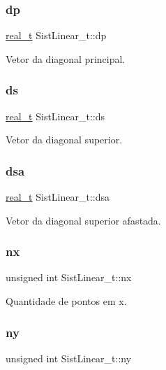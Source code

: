 \subsubsection{\texorpdfstring{dp}{dp}}
{\footnotesize\ttfamily \hyperlink{SistemasLineares_8h_a0d00e2b3dfadee81331bbb39068570c4}{real\+\_\+t} Sist\+Linear\+\_\+t\+::dp}

Vetor da diagonal principal. \mbox{\label{structSistLinear__t_a2ecc07569471ddd006631f7514960bbb}} 
\subsubsection{\texorpdfstring{ds}{ds}}
{\footnotesize\ttfamily \hyperlink{SistemasLineares_8h_a0d00e2b3dfadee81331bbb39068570c4}{real\+\_\+t} Sist\+Linear\+\_\+t\+::ds}

Vetor da diagonal superior. \mbox{\label{structSistLinear__t_aefdf2d67bee5c6471bae21bb7ced88a6}} 
\subsubsection{\texorpdfstring{dsa}{dsa}}
{\footnotesize\ttfamily \hyperlink{SistemasLineares_8h_a0d00e2b3dfadee81331bbb39068570c4}{real\+\_\+t} Sist\+Linear\+\_\+t\+::dsa}

Vetor da diagonal superior afastada. \mbox{\label{structSistLinear__t_a0f02ce66276316fd835180cf6a033001}} 
\subsubsection{\texorpdfstring{nx}{nx}}
{\footnotesize\ttfamily unsigned int Sist\+Linear\+\_\+t\+::nx}

Quantidade de pontos em x. \mbox{\label{structSistLinear__t_a84d8f1f84f050ca4dfc93a4ceaef2b9a}} 
\subsubsection{\texorpdfstring{ny}{ny}}
{\footnotesize\ttfamily unsigned int Sist\+Linear\+\_\+t\+::ny}

